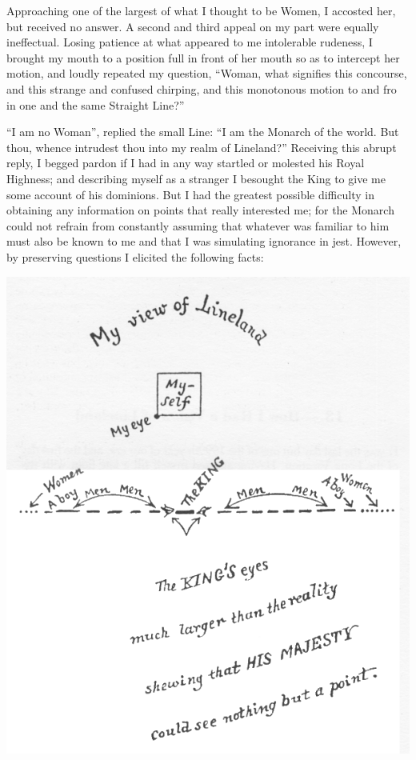 \documentclass[12pt, a4paper, oneside]{memoir}
\begin{document}
Approaching one of the largest of what I thought to be Women, I accosted her,
but received no answer. A second and third appeal on my part were equally
ineffectual. Losing patience at what appeared to me intolerable rudeness, I
brought my mouth to a position full in front of her mouth so as to intercept
her motion, and loudly repeated my question, ``Woman, what signifies this
concourse, and this strange and confused chirping, and this monotonous motion
to and fro in one and the same Straight Line?''

``I am no Woman'', replied the small Line: ``I am the Monarch of the world. But
thou, whence intrudest thou into my realm of Lineland?'' Receiving this abrupt
reply, I begged pardon if I had in any way startled or molested his Royal
Highness; and describing myself as a stranger I besought the King to give me
some account of his dominions. But I had the greatest possible difficulty in
obtaining any information on points that really interested me; for the Monarch
could not refrain from constantly assuming that whatever was familiar to him
must also be known to me and that I was simulating ignorance in jest. However,
by preserving questions I elicited the following facts:

\includegraphics[trim=20mm 0mm 0mm 0mm,width=\linewidth]{fig6}
\end{document}
